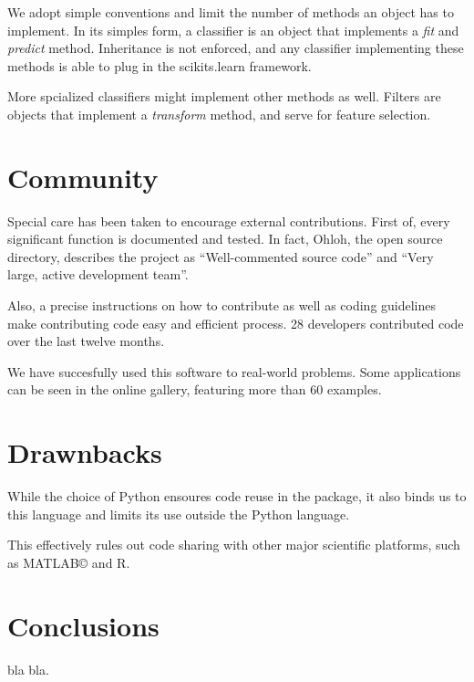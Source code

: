 \documentclass[twoside,11pt]{article}
\begin{document}
We adopt simple conventions and limit the number of methods an object
has to implement. In its simples form, a classifier is an object that
implements a \emph{fit} and \emph{predict} method. Inheritance is not
enforced, and any classifier implementing these methods is able to
plug in the scikits.learn framework.


More spcialized classifiers might implement other methods as
well. Filters are objects that implement a \emph{transform} method,
and serve for feature selection.



\section{Community}

Special care has been taken to encourage external contributions. First
of, every significant function is documented and tested. In fact,
Ohloh, the open source directory, describes the project as
``Well-commented source code'' and ``Very large, active development
team''.

Also, a precise instructions on how to contribute as well as coding
guidelines make contributing code easy and efficient process. 28
developers contributed code over the last twelve months.

We have succesfully used this software to real-world problems. Some
applications can be seen in the online gallery, featuring more than 60
examples.


\section{Drawnbacks}
While the choice of Python ensoures code reuse in the package, it also
binds us to this language and limits its use outside the Python
language.

This effectively rules out code sharing with other major scientific
platforms, such as MATLAB© and R.


\section{Conclusions}

bla bla.
\end{document}
